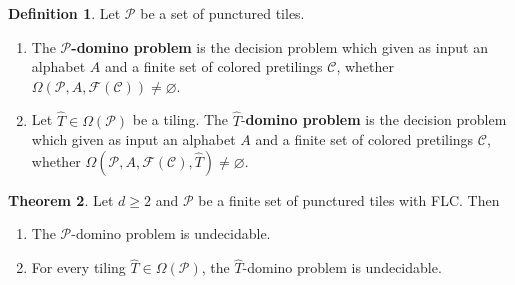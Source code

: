 \documentclass{article}
\theoremstyle{definition}
\newtheorem{theorem}{Theorem}[section] %
\newtheorem{defn}[theorem]{Definition} %
\theoremstyle{definition}
\newcommand{\PP}{\mathcal{P}}
\newcommand{\FF}{\mathcal{F}}
\newcommand{\define}[1]{\textbf{#1}}
\newcommand{\todo}[1]{\textcolor{red}{\textnormal{TODO: #1}}}
\begin{document}
\begin{defn}
    Let $\PP$ be a set of punctured tiles.
    \begin{enumerate}
        \item The \define{$\PP$-domino problem} is the decision problem which given as input an alphabet $A$ and a finite set of colored pretilings $\mathcal{C}$, whether $\Omega(\PP,A,\FF(\mathcal{C}))\neq \varnothing$.
        \item Let $\widehat{T}\in \Omega(\PP)$ be a tiling. The $\widehat{T}$-\define{domino problem} is the decision problem which given as input an alphabet $A$ and a finite set of colored pretilings $\mathcal{C}$, whether $\Omega(\PP,A,\FF(\mathcal{C}), \widehat{T})\neq \varnothing$.
    \end{enumerate}
\end{defn}



\begin{theorem}
\label{thm:domino_geom}
Let $d\geq 2$ and $\PP$ be a finite set of punctured tiles with FLC. Then
\begin{enumerate}
    \item The $\PP$-domino problem is undecidable.
    \item For every tiling $\widehat{T}\in \Omega(\PP)$, the $\widehat{T}$-domino problem is undecidable.
\end{enumerate}
\end{theorem}
\end{document}
